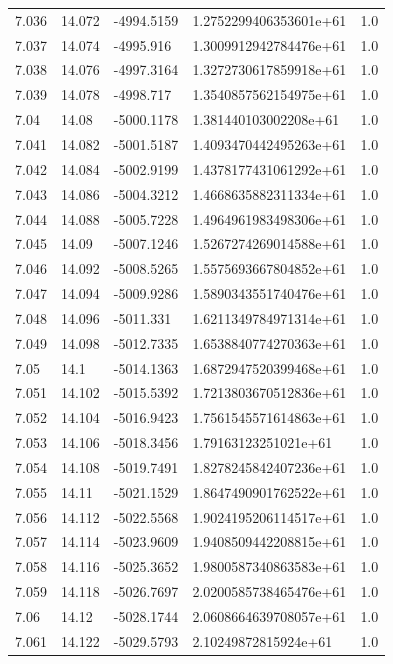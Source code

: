 \begin{tabular}{lllll}
7.036 & 14.072 & -4994.5159 & 1.2752299406353601e+61 & 1.0 \\
7.037 & 14.074 & -4995.916 & 1.3009912942784476e+61 & 1.0 \\
7.038 & 14.076 & -4997.3164 & 1.3272730617859918e+61 & 1.0 \\
7.039 & 14.078 & -4998.717 & 1.3540857562154975e+61 & 1.0 \\
7.04 & 14.08 & -5000.1178 & 1.381440103002208e+61 & 1.0 \\
7.041 & 14.082 & -5001.5187 & 1.4093470442495263e+61 & 1.0 \\
7.042 & 14.084 & -5002.9199 & 1.4378177431061292e+61 & 1.0 \\
7.043 & 14.086 & -5004.3212 & 1.4668635882311334e+61 & 1.0 \\
7.044 & 14.088 & -5005.7228 & 1.4964961983498306e+61 & 1.0 \\
7.045 & 14.09 & -5007.1246 & 1.5267274269014588e+61 & 1.0 \\
7.046 & 14.092 & -5008.5265 & 1.5575693667804852e+61 & 1.0 \\
7.047 & 14.094 & -5009.9286 & 1.5890343551740476e+61 & 1.0 \\
7.048 & 14.096 & -5011.331 & 1.6211349784971314e+61 & 1.0 \\
7.049 & 14.098 & -5012.7335 & 1.6538840774270363e+61 & 1.0 \\
7.05 & 14.1 & -5014.1363 & 1.6872947520399468e+61 & 1.0 \\
7.051 & 14.102 & -5015.5392 & 1.7213803670512836e+61 & 1.0 \\
7.052 & 14.104 & -5016.9423 & 1.7561545571614863e+61 & 1.0 \\
7.053 & 14.106 & -5018.3456 & 1.79163123251021e+61 & 1.0 \\
7.054 & 14.108 & -5019.7491 & 1.8278245842407236e+61 & 1.0 \\
7.055 & 14.11 & -5021.1529 & 1.8647490901762522e+61 & 1.0 \\
7.056 & 14.112 & -5022.5568 & 1.9024195206114517e+61 & 1.0 \\
7.057 & 14.114 & -5023.9609 & 1.9408509442208815e+61 & 1.0 \\
7.058 & 14.116 & -5025.3652 & 1.9800587340863583e+61 & 1.0 \\
7.059 & 14.118 & -5026.7697 & 2.0200585738465476e+61 & 1.0 \\
7.06 & 14.12 & -5028.1744 & 2.0608664639708057e+61 & 1.0 \\
7.061 & 14.122 & -5029.5793 & 2.10249872815924e+61 & 1.0 \\

\end{tabular}
